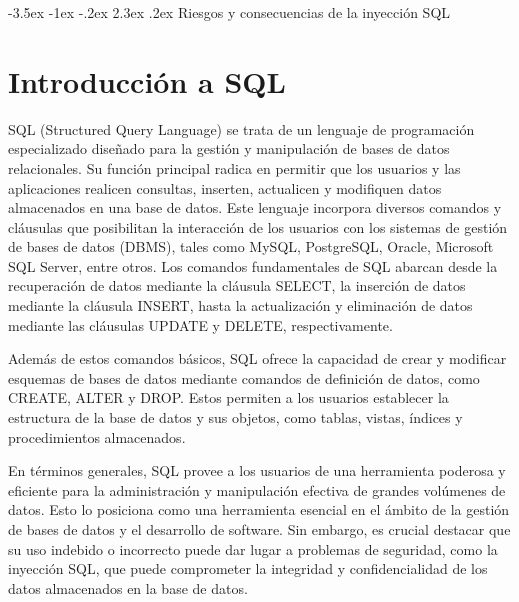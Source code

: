 \documentclass[11pt]{report}
\makeatletter
\renewcommand\chapter{\@startsection{chapter}{0}{\z@}%
    {-3.5ex \@plus -1ex \@minus -.2ex}%
    {2.3ex \@plus.2ex}%
    {\normalfont\Large\bfseries}}
\makeatother
\begin{document}
\cleardoublepage

\chapter{Riesgos y consecuencias de la inyección SQL}
\section{Introducción a SQL}
SQL (Structured Query Language) se trata de un lenguaje de programación especializado
diseñado para la gestión y manipulación de bases de datos relacionales. Su función
principal radica en permitir que los usuarios y las aplicaciones realicen consultas, inserten,
actualicen y modifiquen datos almacenados en una base de datos.
Este lenguaje incorpora diversos comandos y cláusulas que posibilitan la interacción de los
usuarios con los sistemas de gestión de bases de datos (DBMS), tales como MySQL,
PostgreSQL, Oracle, Microsoft SQL Server, entre otros. Los comandos fundamentales de
SQL abarcan desde la recuperación de datos mediante la cláusula SELECT, la inserción de
datos mediante la cláusula INSERT, hasta la actualización y eliminación de datos mediante
las cláusulas UPDATE y DELETE, respectivamente.

Además de estos comandos básicos, SQL ofrece la capacidad de crear y modificar
esquemas de bases de datos mediante comandos de definición de datos, como CREATE,
ALTER y DROP. Estos permiten a los usuarios establecer la estructura de la base de datos
y sus objetos, como tablas, vistas, índices y procedimientos almacenados.

En términos generales, SQL provee a los usuarios de una herramienta poderosa y eficiente
para la administración y manipulación efectiva de grandes volúmenes de datos. Esto lo
posiciona como una herramienta esencial en el ámbito de la gestión de bases de datos y el
desarrollo de software. Sin embargo, es crucial destacar que su uso indebido o incorrecto
puede dar lugar a problemas de seguridad, como la inyección SQL, que puede
comprometer la integridad y confidencialidad de los datos almacenados en la base de datos.
\end{document}
